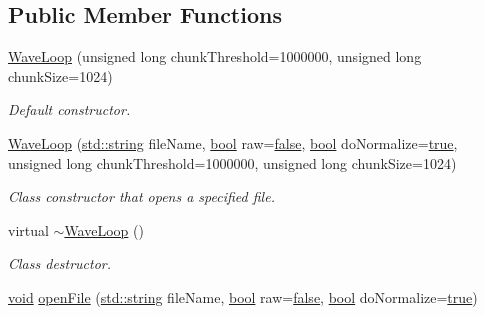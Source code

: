 \subsection*{Public Member Functions}
\begin{DoxyCompactItemize}
\item 
\hyperlink{class_nyq_1_1_wave_loop_a446643affe3204f752f16c5afb89b4b1}{Wave\+Loop} (unsigned long chunk\+Threshold=1000000, unsigned long chunk\+Size=1024)
\begin{DoxyCompactList}\small\item\em Default constructor. \end{DoxyCompactList}\item 
\hyperlink{class_nyq_1_1_wave_loop_acf1a4bb5d78c393ae6d836196b28345d}{Wave\+Loop} (\hyperlink{test__lib_f_l_a_c_2format_8c_ab02026ad0de9fb6c1b4233deb0a00c75}{std\+::string} file\+Name, \hyperlink{mac_2config_2i386_2lib-src_2libsoxr_2soxr-config_8h_abb452686968e48b67397da5f97445f5b}{bool} raw=\hyperlink{mac_2config_2i386_2lib-src_2libsoxr_2soxr-config_8h_a65e9886d74aaee76545e83dd09011727}{false}, \hyperlink{mac_2config_2i386_2lib-src_2libsoxr_2soxr-config_8h_abb452686968e48b67397da5f97445f5b}{bool} do\+Normalize=\hyperlink{mac_2config_2i386_2lib-src_2libsoxr_2soxr-config_8h_a41f9c5fb8b08eb5dc3edce4dcb37fee7}{true}, unsigned long chunk\+Threshold=1000000, unsigned long chunk\+Size=1024)
\begin{DoxyCompactList}\small\item\em Class constructor that opens a specified file. \end{DoxyCompactList}\item 
virtual \hyperlink{class_nyq_1_1_wave_loop_ac79a5caf3e6a147a52ceda1d51191894}{$\sim$\+Wave\+Loop} ()
\begin{DoxyCompactList}\small\item\em Class destructor. \end{DoxyCompactList}\item 
\hyperlink{sound_8c_ae35f5844602719cf66324f4de2a658b3}{void} \hyperlink{class_nyq_1_1_wave_loop_a9cf7b6c5241b5c86b1a5cfc7baa4ba67}{open\+File} (\hyperlink{test__lib_f_l_a_c_2format_8c_ab02026ad0de9fb6c1b4233deb0a00c75}{std\+::string} file\+Name, \hyperlink{mac_2config_2i386_2lib-src_2libsoxr_2soxr-config_8h_abb452686968e48b67397da5f97445f5b}{bool} raw=\hyperlink{mac_2config_2i386_2lib-src_2libsoxr_2soxr-config_8h_a65e9886d74aaee76545e83dd09011727}{false}, \hyperlink{mac_2config_2i386_2lib-src_2libsoxr_2soxr-config_8h_abb452686968e48b67397da5f97445f5b}{bool} do\+Normalize=\hyperlink{mac_2config_2i386_2lib-src_2libsoxr_2soxr-config_8h_a41f9c5fb8b08eb5dc3edce4dcb37fee7}{true})

\end{DoxyCompactItemize}

